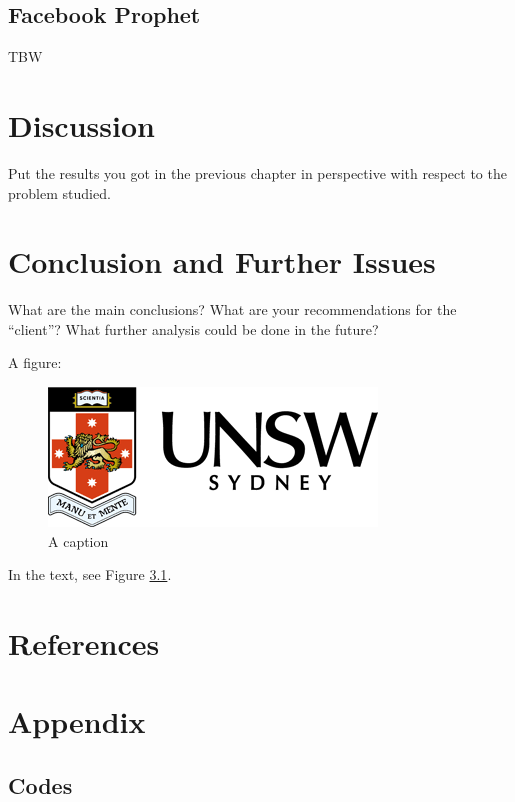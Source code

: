 \documentclass[mstat,12pt]{unswthesis}
\begin{document}
\section{Facebook Prophet}\label{facebook-prophet}

TBW

\chapter{Discussion}\label{discussion}

Put the results you got in the previous chapter in perspective with
respect to the problem studied.

\chapter{Conclusion and Further
Issues}\label{conclusion-and-further-issues}

What are the main conclusions? What are your recommendations for the
``client''? What further analysis could be done in the future?

A figure:

\begin{figure}[H]
\includegraphics{unsw-logo.png}
\caption{A caption}\label{myfigure}
\end{figure}

In the text, see Figure \ref{myfigure}.

\chapter*{References}\label{references}

 


\chapter*{Appendix}\label{appendix}

\section*{\texorpdfstring{\textbf{Codes}}{Codes}}\label{codes}
\end{document}
